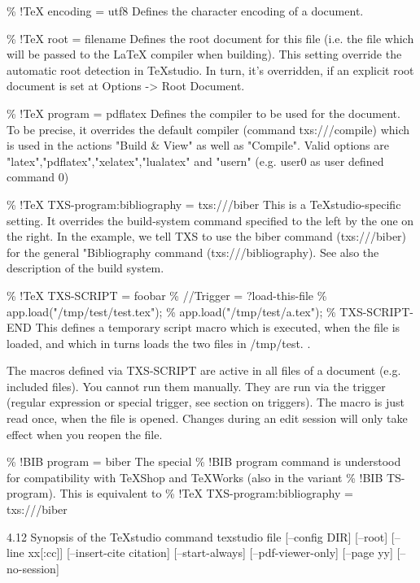 \documentclass{article}
\begin{document}
	\% !TeX encoding = utf8
	Defines the character encoding of a document.
	
	\% !TeX root = filename
	Defines the root document for this file (i.e. the file which will be passed to the LaTeX compiler when building). This setting override the automatic root detection in TeXstudio. In turn, it's overridden, if an explicit root document is set at Options -> Root Document.
	
	\% !TeX program = pdflatex
	Defines the compiler to be used for the document. To be precise, it overrides the default compiler (command txs:///compile) which is used in the actions "Build \& View" as well as "Compile". Valid options are "latex","pdflatex","xelatex","lualatex" and "usern" (e.g. user0 as user defined command 0)
	
	\% !TeX TXS-program:bibliography = txs:///biber
	This is a TeXstudio-specific setting. It overrides the build-system command specified to the left by the one on the right. In the example, we tell TXS to use the biber command (txs:///biber) for the general "Bibliography command (txs:///bibliography). See also the description of the build system.
	
	\% !TeX TXS-SCRIPT = foobar
	\% //Trigger = ?load-this-file
	\% app.load("/tmp/test/test.tex");
	\% app.load("/tmp/test/a.tex");
	\% TXS-SCRIPT-END
	This defines a temporary script macro which is executed, when the file is loaded, and which in turns loads the two files in /tmp/test. .
	
	The macros defined via TXS-SCRIPT are active in all files of a document (e.g. included files). You cannot run them manually. They are run via the trigger (regular expression or special trigger, see section on triggers). The macro is just read once, when the file is opened. Changes during an edit session will only take effect when you reopen the file.
	
	\% !BIB program = biber
	The special \% !BIB program command is understood for compatibility with TeXShop and TeXWorks (also in the variant \% !BIB TS-program). This is equivalent to \% !TeX TXS-program:bibliography = txs:///biber
	
	4.12 Synopsis of the TeXstudio command
	texstudio file [--config DIR] [--root] [--line xx[:cc]] [--insert-cite citation] [--start-always] [--pdf-viewer-only] [--page yy] [--no-session]
	
\end{document}
